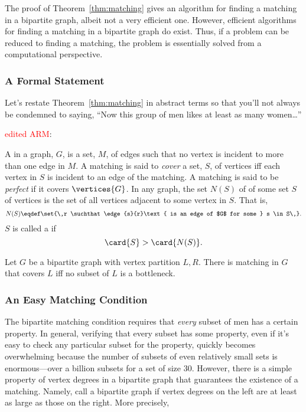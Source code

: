 The proof of Theorem~\ref{thm:matching} gives an algorithm for finding
a matching in a bipartite graph, albeit not a very efficient one.
However, efficient algorithms for finding a matching in a bipartite
graph do exist.  Thus, if a problem can be reduced to finding a
matching, the problem is essentially solved from a computational
perspective.

\subsubsection{A Formal Statement}

Let's restate Theorem~\ref{thm:matching} in abstract terms so that
you'll not always be condemned to saying, ``Now this group of men
likes at least as many women\dots''

\begin{definition}\label{def:5K}
\begin{editingnotes}
\textcolor{red}{edited ARM}:
\end{editingnotes}
A  in a graph, $G$, is a set, $M$, of
edges such that no vertex is incident to more than one edge in $M$.  A
matching is said to \emph{cover} a set, $S$, of vertices iff each
vertex in $S$ is incident to an edge of the matching.  A matching is
said to be \emph{perfect} if it covers $\vertices{G}$.  In any graph,
the set $N(S)$ of  of some set $S$ of vertices is
the set of all vertices adjacent to some vertex in $S$.  That is,
\[
N(S) \eqdef \set{\,r \suchthat \edge{s}{r}\text{ is an edge of $G$ for
    some } s \in S\,}.
\]
$S$ is called a  if
\[
\card{S} > \card{N(S)}.
\]
\end{definition}

\begin{theorem}\label{thm:halls}
  Let $G$ be a bipartite graph with vertex partition $L,R$.  There is matching in $G$
  that covers $L$ iff no subset of $L$ is a bottleneck.
\end{theorem}

\subsubsection{An Easy Matching Condition}

The bipartite matching condition requires that \emph{every} subset of
men has a certain property.  In general, verifying that every subset
has some property, even if it's easy to check any particular subset
for the property, quickly becomes overwhelming because the number of
subsets of even relatively small sets is enormous---over a billion
subsets for a set of size 30.  However, there is a simple property of
vertex degrees in a bipartite graph that guarantees the existence of a
matching.  Namely, call a bipartite graph 
if vertex degrees on the left are at least as large as those on the
right.  More precisely,

